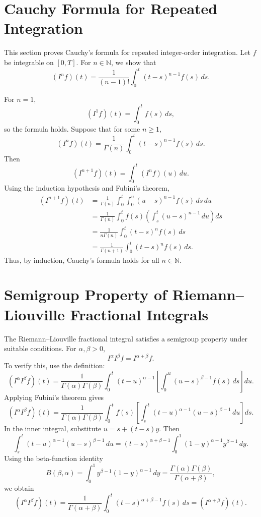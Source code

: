 \documentclass[11pt,a4paper]{report}
\begin{document}
\section{Cauchy Formula for Repeated Integration}

This section proves Cauchy's formula for repeated integer-order integration. Let $f$ be integrable on $[0,T]$. For $n\in\mathbb{N}$, we show that
\[
(I^n f)(t)
=
\frac{1}{(n-1)!}
\int_0^t
(t-s)^{n-1}f(s)\,ds.
\]

For $n=1$,
\[
(I^1 f)(t)
=
\int_0^t f(s)\,ds,
\]
so the formula holds. Suppose that for some $n\ge1$,
\[
(I^n f)(t)
=
\frac{1}{\Gamma(n)}
\int_0^t
(t-s)^{n-1}f(s)\,ds.
\]
Then
\[
(I^{n+1}f)(t)
=
\int_0^t (I^n f)(u)\,du.
\]
Using the induction hypothesis and Fubini's theorem,
\[
\begin{aligned}
(I^{n+1}f)(t)
&=
\frac{1}{\Gamma(n)}
\int_0^t
\int_0^u
(u-s)^{n-1}f(s)\,ds\,du  \\
&=
\frac{1}{\Gamma(n)}
\int_0^t
f(s)
\left(
\int_s^t
(u-s)^{n-1}\,du
\right)ds  \\
&=
\frac{1}{n\Gamma(n)}
\int_0^t
(t-s)^n f(s)\,ds  \\
&=
\frac{1}{\Gamma(n+1)}
\int_0^t
(t-s)^n f(s)\,ds.
\end{aligned}
\]
Thus, by induction, Cauchy's formula holds for all $n\in\mathbb{N}$.

\section{Semigroup Property of Riemann--Liouville Fractional Integrals}

The Riemann--Liouville fractional integral satisfies a semigroup property under suitable conditions. For $\alpha,\beta>0$,
\[
I^\alpha I^\beta f
=
I^{\alpha+\beta}f.
\]
To verify this, use the definition:
\[
(I^\alpha I^\beta f)(t)
=
\frac{1}{\Gamma(\alpha)\Gamma(\beta)}
\int_0^t
(t-u)^{\alpha-1}
\left[
\int_0^u
(u-s)^{\beta-1}f(s)\,ds
\right]du.
\]
Applying Fubini's theorem gives
\[
(I^\alpha I^\beta f)(t)
=
\frac{1}{\Gamma(\alpha)\Gamma(\beta)}
\int_0^t
f(s)
\left[
\int_s^t
(t-u)^{\alpha-1}
(u-s)^{\beta-1}
\,du
\right]ds.
\]
In the inner integral, substitute $u=s+(t-s)y$. Then
\[
\int_s^t
(t-u)^{\alpha-1}
(u-s)^{\beta-1}
\,du
=
(t-s)^{\alpha+\beta-1}
\int_0^1
(1-y)^{\alpha-1}y^{\beta-1}\,dy.
\]
Using the beta-function identity
\[
B(\beta,\alpha)
=
\int_0^1
y^{\beta-1}(1-y)^{\alpha-1}\,dy
=
\frac{\Gamma(\alpha)\Gamma(\beta)}
{\Gamma(\alpha+\beta)},
\]
we obtain
\[
(I^\alpha I^\beta f)(t)
=
\frac{1}{\Gamma(\alpha+\beta)}
\int_0^t
(t-s)^{\alpha+\beta-1}f(s)\,ds
=
(I^{\alpha+\beta}f)(t).
\]
\end{document}
